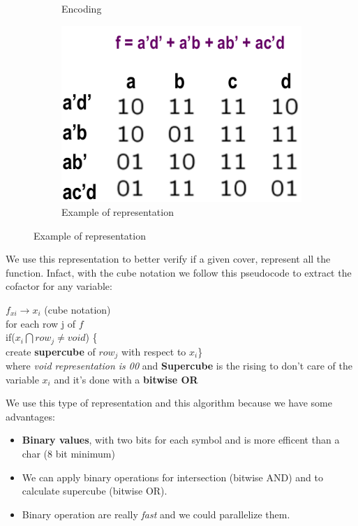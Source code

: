 \begin{figure}[H]
\begin{subfigure}[b]{0.15\textwidth}
		\caption{Encoding}
		\label{fig:encoding}
	\end{subfigure}
	\quad
	\quad
	\quad
	\begin{subfigure}[b]{0.30\textwidth}
		\includegraphics[width=\textwidth]{./Cap6/Images/Image15.png}
		\caption{Example of representation}
		\label{fig:represexample}
	\end{subfigure}
\end{figure}

We use this representation to better verify if a given cover, represent all the function. Infact, with the cube notation we follow this pseudocode to extract the cofactor for any variable:

\begin{center}
	$f_{xi} \rightarrow x_{i}$ (cube notation)\\
	for each row j of $f$ \\
	if($x_{i} \bigcap row_{j} \neq void$) \{ \\
		create \textbf{supercube} of $row_{j}$ with respect to $x_{i}$\}
		\bigskip\\
		where \textit{void representation is 00 }and \textbf{Supercube} is the rising to don't care of the variable $x_{i}$ and it's done with a \textbf{bitwise OR} 
\end{center}
\bigskip

We use this type of representation and this algorithm because we have some advantages:
\begin{itemize}
	\item \textbf{Binary values}, with two bits for each symbol and is more efficent than a char (8 bit minimum)
	\item We can apply binary operations for intersection (bitwise AND) and to calculate supercube (bitwise OR).
	\item Binary operation are really \textit{fast} and we could parallelize them.
\end{itemize}

